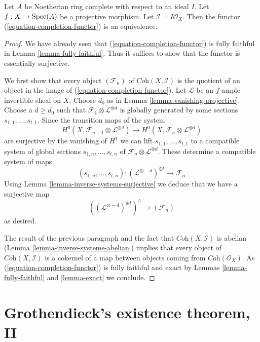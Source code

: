 \begin{lemma}
\label{lemma-existence-projective}
Let $A$ be Noetherian ring complete with respect to an ideal $I$.
Let $f : X \to \mathop{\mathrm{Spec}}(A)$ be a projective morphism. Let
$\mathcal{I} = I\mathcal{O}_X$.
Then the functor (\ref{equation-completion-functor}) is an equivalence.
\end{lemma}

\begin{proof}
We have already seen that (\ref{equation-completion-functor}) is
fully faithful in Lemma \ref{lemma-fully-faithful}. Thus it suffices
to show that the functor is essentially surjective.

\medskip\noindent
We first show that every object $(\mathcal{F}_n)$ of
$\textit{Coh}(X, \mathcal{I})$ is the quotient of an object
in the image of (\ref{equation-completion-functor}). 
Let $\mathcal{L}$ be an $f$-ample invertible sheaf on $X$.
Choose $d_0$ as in Lemma \ref{lemma-vanishing-projective}.
Choose a $d \geq d_0$ such that
$\mathcal{F}_1 \otimes \mathcal{L}^{\otimes d}$
is globally generated by some sections $s_{1, 1}, \ldots, s_{t, 1}$.
Since the transition maps of the system
$$
H^0(X, \mathcal{F}_{n + 1} \otimes \mathcal{L}^{\otimes d})
\longrightarrow
H^0(X, \mathcal{F}_n \otimes \mathcal{L}^{\otimes d})
$$
are surjective by the vanishing of $H^1$ we can lift
$s_{1, 1}, \ldots, s_{t, 1}$ to a compatible system of global sections
$s_{1, n}, \ldots, s_{t, n}$ of
$\mathcal{F}_n \otimes \mathcal{L}^{\otimes d}$.
These determine a compatible system of maps
$$
(s_{1, n}, \ldots, s_{t, n}) :
(\mathcal{L}^{\otimes -d})^{\oplus t} \longrightarrow \mathcal{F}_n
$$
Using Lemma \ref{lemma-inverse-systems-surjective}
we deduce that we have a surjective map
$$
\left((\mathcal{L}^{\otimes -d})^{\oplus t}\right)^\wedge
\longrightarrow
(\mathcal{F}_n)
$$
as desired.

\medskip\noindent
The result of the previous paragraph and the fact that
$\textit{Coh}(X, \mathcal{I})$ is abelian
(Lemma \ref{lemma-inverse-systems-abelian})
implies that
every object of $\textit{Coh}(X, \mathcal{I})$ is a cokernel
of a map between objects coming from $\textit{Coh}(\mathcal{O}_X)$.
As (\ref{equation-completion-functor}) is fully faithful and exact by
Lemmas \ref{lemma-fully-faithful} and \ref{lemma-exact}
we conclude.
\end{proof}








\section{Grothendieck's existence theorem, II}
\label{section-existence-proper}

